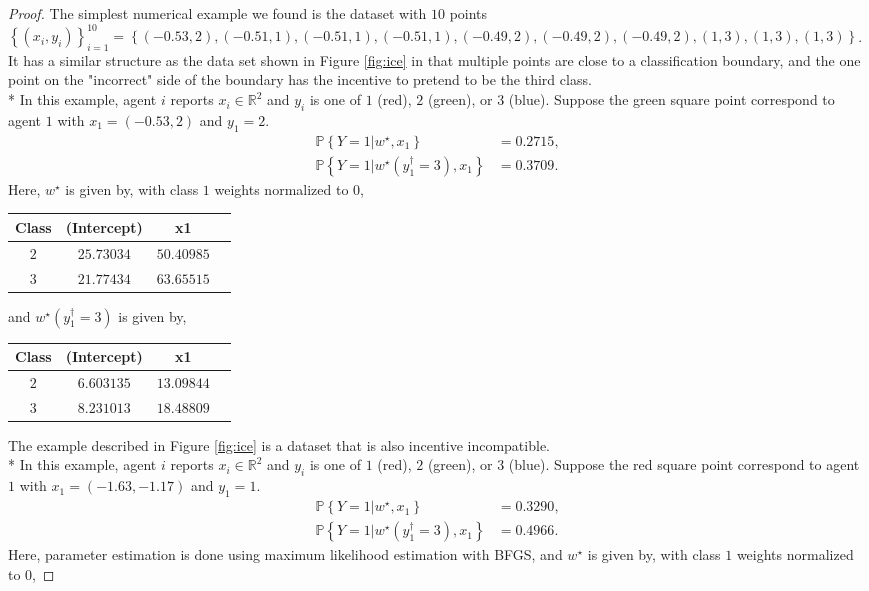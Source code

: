 \documentclass{article}
\begin{document}
\begin{proof} \label{proof:logitpf} 
The simplest numerical example we found is the dataset with $10$ points $\left\{\left(x_{i}, y_{i}\right)\right\}_{i=1}^{10} = \left\{\left(-0.53, 2\right), \left(-0.51, 1\right), \left(-0.51, 1\right), \left(-0.51, 1\right), \left(-0.49, 2\right), \left(-0.49, 2\right), \left(-0.49, 2\right), \left(1, 3\right), \left(1, 3\right), \left(1, 3\right)\right\}$. It has a similar structure as the data set shown in Figure \ref{fig:ice} in that multiple points are close to a classification boundary, and the one point on the "incorrect" side of the boundary has the incentive to pretend to be the third class.
\\* In this example, agent $i $ reports $x_{i} \in \mathbb{R}^{2}$ and $y_{i}$ is one of $1$ (red), $2$ (green), or $3$ (blue). Suppose the green square point correspond to agent $1$ with $x_{1} = \left(-0.53, 2\right)$ and $y_{1} = 2$.
\begin{align*}
\mathbb{P}\left\{Y = 1 | w^\star , x_{1}\right\} &= 0.2715,
\\ \mathbb{P}\left\{Y = 1 | w^\star \left(y^{\dagger}_{1} = 3\right), x_{1}\right\} &= 0.3709.
\end{align*}
Here, $w^\star $ is given by, with class $1$ weights normalized to $0$,

\begin{center} \begin{tabular}{|c|c|c|c|}
\hline
 Class &(Intercept) &x1\\ \hline
$2$ &$25.73034$ &$50.40985$\\ \hline
$3$ &$21.77434$ &$63.65515$\\ \hline
\end{tabular} \end{center}
and $w^\star \left(y^{\dagger}_{1} = 3\right)$ is given by,

\begin{center} \begin{tabular}{|c|c|c|c|}
\hline
 Class &(Intercept) &x1\\ \hline
$2$ &$6.603135$ &$13.09844$\\ \hline
$3$ &$8.231013$ &$18.48809$\\ \hline
\end{tabular} \end{center}
The example described in Figure \ref{fig:ice} is a dataset that is also incentive incompatible.
\\* In this example, agent $i $ reports $x_{i} \in \mathbb{R}^{2}$ and $y_{i}$ is one of $1$ (red), $2$ (green), or $3$ (blue). Suppose the red square point correspond to agent $1$ with $x_{1} = \left(-1.63, -1.17\right)$ and $y_{1} = 1$.
\begin{align*}
\mathbb{P}\left\{Y = 1 | w^\star , x_{1}\right\} &= 0.3290,
\\ \mathbb{P}\left\{Y = 1 | w^\star \left(y^{\dagger}_{1} = 3\right), x_{1}\right\} &= 0.4966.
\end{align*}
Here, parameter estimation is done using maximum likelihood estimation with BFGS, and $w^\star $ is given by, with class $1$ weights normalized to $0$,


\end{proof}
\end{document}
